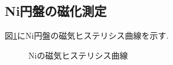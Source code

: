 \subsection{Ni円盤の磁化測定}
図\ref{fig:NI_hyteresis}にNi円盤の磁気ヒステリシス曲線を示す.
\begin{figure}[hptb]
  \begin{center}
    
    \caption{Niの磁気ヒステリシス曲線}
    \label{fig:NI_hyteresis}
  \end{center}
\end{figure}